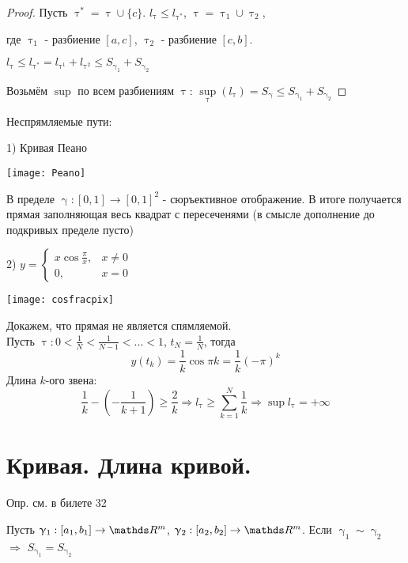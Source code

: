 \documentclass[12pt, fleqn]{article}
\begin{document}
\begin{Property}[3]
\begin{Property}[4]
\begin{Property}[2, аддитивность]
\begin{Proof}
\begin{proof}
    Пусть $\uptau^* = \uptau \cup \{c\}$. $l_\uptau \leqslant l_{\uptau^*}$, $\uptau = \uptau_1 \cup \uptau_2$, 
    
    где $\uptau_1$ - разбиение $[a,c]$, $\uptau_2$ - разбиение $[c,b]$.
    
    $l_\uptau \leqslant l_{\uptau^*} = l_{\uptau^1} + l_{\uptau^2} \leqslant S_{\upgamma_1} + S_{\upgamma_2}$
    
    Возьмём $\sup$ по всем разбиениям $\uptau$: $\sup\limits_{\uptau} (l_{\uptau}) = S_\upgamma \leqslant S_{\upgamma_1} + S_{\upgamma_2}$
\end{proof}

\begin{examples}
    Неспрямляемые пути:
    
    1) Кривая Пеано
    
    \texttt{[image: Peano]}
    
    В пределе $\upgamma: [0,1] \rightarrow [0,1]^2$ - сюръективное отображение. В итоге получается прямая заполняющая весь квадрат с пересеченями (в смысле дополнение до подкривых  пределе пусто)
    
    2) $y = 
    \begin{cases}
       x \cos \frac{\pi}{x}, & x \neq 0\\
       0, & x = 0
     \end{cases}$
    
    \texttt{[image: cosfracpix]}
    
    Докажем, что прямая не является спямляемой. 
    \\
    Пусть $\uptau: 0 < \frac{1}{N} < \frac{1}{N -1} < ... < 1$, $t_N = \frac{1}{N}$, тогда 
    \[y(t_k) = \frac{1}{k} \cos \pi k = \frac{1}{k} (-\pi)^k\]
    Длина $k$-ого звена: 
    \[\frac{1}{k} - (-\frac{1}{k+1}) \geqslant \frac{2}{k} \Rightarrow l_\uptau \geqslant \sum\limits_{k=1}^N  \frac{1}{k}\Rightarrow \sup l_\uptau = +\infty\]
\end{examples}

\newpage
\section{Кривая. Длина кривой.}

Опр. см. в билете 32
\begin{theorem} 
    Пусть $\upgamma_1: [a_1,b_1] \rightarrow \R^m$, $\upgamma_2: [a_2,b_2] \rightarrow
    \R^m$. Если $\upgamma_1 \sim \upgamma_2$ $\Rightarrow$ $S_{\upgamma_1} = S_{\upgamma_2}$
\end{theorem}


\end{Proof}
\end{Property}
\end{Property}
\end{Property}
\end{document}

